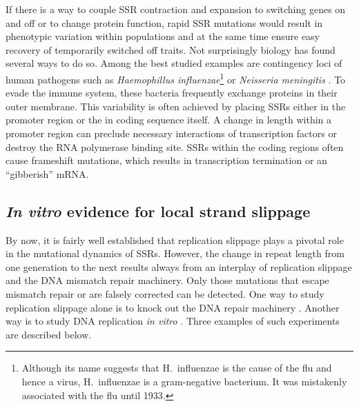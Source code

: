 If there is a way to couple SSR contraction and expansion to switching genes on and off or 
to change protein function, rapid SSR mutations would result in phenotypic variation within 
populations and at the same time ensure easy recovery of temporarily switched off traits. 
Not surprisingly biology has found several ways to do so.
Among the best studied examples are contingency loci of human pathogens such as 
\emph{Haemophillus influenzae}\footnote{Although its name suggests that H.~influenzae
is the cause of the flu and hence a virus, H.~influenzae is a gram-negative bacterium. 
It was mistakenly associated with the flu until 1933.}
or \emph{Neisseria meningitis} \cite{Bayliss_JClinInv_01}. 
To evade the immune system,  these bacteria frequently exchange proteins in their outer 
membrane. This variability is often achieved by placing SSRs either in the promoter region or the in
coding sequence itself. A change in length within a promoter region can preclude necessary
interactions of transcription factors or destroy the RNA polymerase 
binding site. SSRs within the coding regions often cause frameshift mutations, which results 
in transcription termination or an ``gibberish'' mRNA. %





\subsection{\emph{In vitro} evidence for local strand slippage}
By now, it is fairly well established that replication slippage plays a pivotal role in the mutational
dynamics of SSRs. However, the change in repeat length from one generation to the next results
always from an interplay of replication slippage and the DNA mismatch repair machinery. Only
those mutations that escape mismatch repair or are falsely corrected can be detected. One way to study replication
slippage alone is to knock out the DNA repair machinery \cite{Strand_Nature_93}. Another way 
is to study DNA replication \emph{in vitro} \cite{Schloetterer_NAR_92}. Three examples of such 
experiments are described below.  

